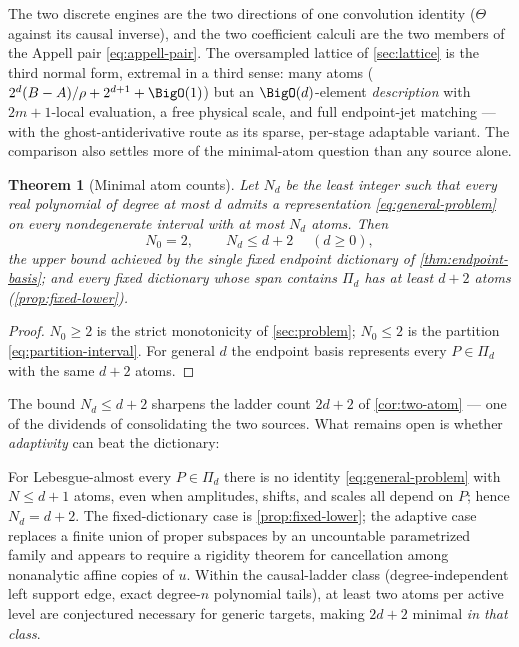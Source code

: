 \documentclass[11pt,oneside]{article}
\numberwithin{equation}{section}
\newtheorem{theorem}{Theorem}[section]
\theoremstyle{definition}
\theoremstyle{remark}
\newcommand{\ThetaTM}{\Theta}
\newcommand{\PiD}{\Pi_d}
\begin{document}
The two discrete engines are the two directions of one convolution
identity ($\ThetaTM$ against its causal inverse), and the two
coefficient calculi are the two members of the Appell pair
\eqref{eq:appell-pair}.  The oversampled lattice of
\cref{sec:lattice} is the third normal form, extremal in a third
sense: many atoms ($2^{d}(B-A)/\rho+2^{d+1}+\BigO(1)$) but an
$\BigO(d)$-element \emph{description} with $2m+1$-local
evaluation, a free physical scale, and full endpoint-jet matching
--- with the ghost-antiderivative route as its sparse, per-stage
adaptable variant.  The comparison also settles more of the
minimal-atom question than any source alone.

\begin{theorem}[Minimal atom counts]
\label{thm:minimal-atoms}
Let $N_d$ be the least integer such that \emph{every} real polynomial
of degree at most $d$ admits a representation
\eqref{eq:general-problem} on every nondegenerate interval with at
most $N_d$ atoms.  Then
\begin{equation}
 N_0=2,
 \qquad
 \boxed{\;N_d\le d+2\;}
 \quad(d\ge0),
 \label{eq:Nd-bounds}
\end{equation}
the upper bound achieved by the single fixed endpoint dictionary of
\cref{thm:endpoint-basis}; and every \emph{fixed} dictionary whose
span contains $\PiD$ has at least $d+2$ atoms
(\cref{prop:fixed-lower}).
\end{theorem}

\begin{proof}
$N_0\ge2$ is the strict monotonicity of \cref{sec:problem};
$N_0\le2$ is the partition \eqref{eq:partition-interval}.  For
general $d$ the endpoint basis represents every $P\in\PiD$ with the
same $d+2$ atoms.
\end{proof}

The bound $N_d\le d+2$ sharpens the ladder count $2d+2$ of
\cref{cor:two-atom} --- one of the dividends of consolidating the two
sources.  What remains open is whether \emph{adaptivity} can beat the
dictionary:

\begin{conjecture}
\label{conj:adaptive-rigidity}
For Lebesgue-almost every $P\in\PiD$ there is no identity
\eqref{eq:general-problem} with $N\le d+1$ atoms, even when
amplitudes, shifts, and scales all depend on $P$; hence
$N_d=d+2$.  The fixed-dictionary case is
\cref{prop:fixed-lower}; the adaptive case replaces a finite union of
proper subspaces by an uncountable parametrized family and appears to
require a rigidity theorem for cancellation among nonanalytic affine
copies of $u$.  Within the causal-ladder class (degree-independent
left support edge, exact degree-$n$ polynomial tails), at least two
atoms per active level are conjectured necessary for generic targets,
making $2d+2$ minimal \emph{in that class}.
\end{conjecture}
\end{document}
